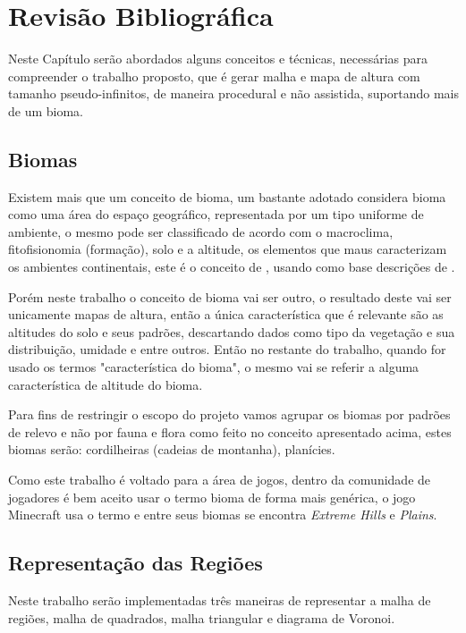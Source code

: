 \chapter{Revisão Bibliográfica}
Neste Capítulo serão abordados alguns conceitos e técnicas, necessárias para
compreender o trabalho proposto, que é 
gerar malha e mapa de altura com tamanho pseudo-infinitos, de maneira procedural
e não assistida, suportando mais de um bioma.

\section{Biomas}
Existem mais que um conceito de bioma, um bastante adotado considera bioma como
uma área do espaço geográfico, representada por um tipo uniforme de ambiente, o
mesmo pode ser classificado de acordo com o macroclima, fitofisionomia (formação),
solo e a altitude, os elementos que maus caracterizam os ambientes continentais, 
este é o conceito de \cite{coutinho2006conceito}, usando como base descrições
de \cite{walter1986vegetaccao}.

Porém neste trabalho o conceito de bioma vai ser outro, o resultado deste
vai ser unicamente mapas de altura, então a única característica que é relevante
são as altitudes do solo e seus padrões, descartando dados como tipo da
vegetação e sua distribuição, umidade e entre outros. Então no restante 
do trabalho, quando for usado os termos "característica do bioma", o mesmo vai
se referir a alguma característica de altitude do bioma.

Para fins de restringir o escopo do projeto vamos agrupar os biomas por padrões
de relevo e não por fauna e flora como feito no conceito apresentado acima,
estes biomas serão: cordilheiras (cadeias de montanha), planícies.

Como este trabalho é voltado para a área de jogos, dentro da comunidade de jogadores
é bem aceito usar o termo bioma de forma mais genérica, o jogo Minecraft usa o
termo e entre seus biomas se encontra \textit{Extreme Hills} e \textit{Plains}.

\section{Representação das Regiões}
Neste trabalho serão implementadas três maneiras de representar a malha de
regiões, malha de quadrados, malha triangular e diagrama de Voronoi.

